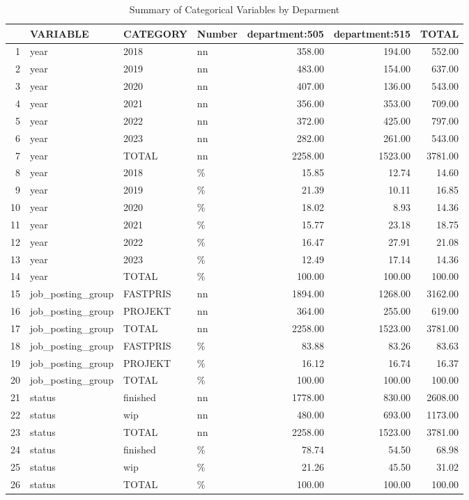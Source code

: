 \begin{sidewaystable}[ht]
\centering
\caption{Summary of Categorical Variables by Deparment} 
\begin{tabular}{rlllrrr}
  \hline
 & VARIABLE & CATEGORY & Number & department:505 & department:515 & TOTAL \\ 
  \hline
1 & year & 2018 & nn & 358.00 & 194.00 & 552.00 \\ 
  2 & year & 2019 & nn & 483.00 & 154.00 & 637.00 \\ 
  3 & year & 2020 & nn & 407.00 & 136.00 & 543.00 \\ 
  4 & year & 2021 & nn & 356.00 & 353.00 & 709.00 \\ 
  5 & year & 2022 & nn & 372.00 & 425.00 & 797.00 \\ 
  6 & year & 2023 & nn & 282.00 & 261.00 & 543.00 \\ 
  7 & year & TOTAL & nn & 2258.00 & 1523.00 & 3781.00 \\ 
  8 & year & 2018 & \% & 15.85 & 12.74 & 14.60 \\ 
  9 & year & 2019 & \% & 21.39 & 10.11 & 16.85 \\ 
  10 & year & 2020 & \% & 18.02 & 8.93 & 14.36 \\ 
  11 & year & 2021 & \% & 15.77 & 23.18 & 18.75 \\ 
  12 & year & 2022 & \% & 16.47 & 27.91 & 21.08 \\ 
  13 & year & 2023 & \% & 12.49 & 17.14 & 14.36 \\ 
  14 & year & TOTAL & \% & 100.00 & 100.00 & 100.00 \\ 
  15 & job\_posting\_group & FASTPRIS & nn & 1894.00 & 1268.00 & 3162.00 \\ 
  16 & job\_posting\_group & PROJEKT & nn & 364.00 & 255.00 & 619.00 \\ 
  17 & job\_posting\_group & TOTAL & nn & 2258.00 & 1523.00 & 3781.00 \\ 
  18 & job\_posting\_group & FASTPRIS & \% & 83.88 & 83.26 & 83.63 \\ 
  19 & job\_posting\_group & PROJEKT & \% & 16.12 & 16.74 & 16.37 \\ 
  20 & job\_posting\_group & TOTAL & \% & 100.00 & 100.00 & 100.00 \\ 
  21 & status & finished & nn & 1778.00 & 830.00 & 2608.00 \\ 
  22 & status & wip & nn & 480.00 & 693.00 & 1173.00 \\ 
  23 & status & TOTAL & nn & 2258.00 & 1523.00 & 3781.00 \\ 
  24 & status & finished & \% & 78.74 & 54.50 & 68.98 \\ 
  25 & status & wip & \% & 21.26 & 45.50 & 31.02 \\ 
  26 & status & TOTAL & \% & 100.00 & 100.00 & 100.00 \\ 
   \hline
\end{tabular}
\end{sidewaystable}
